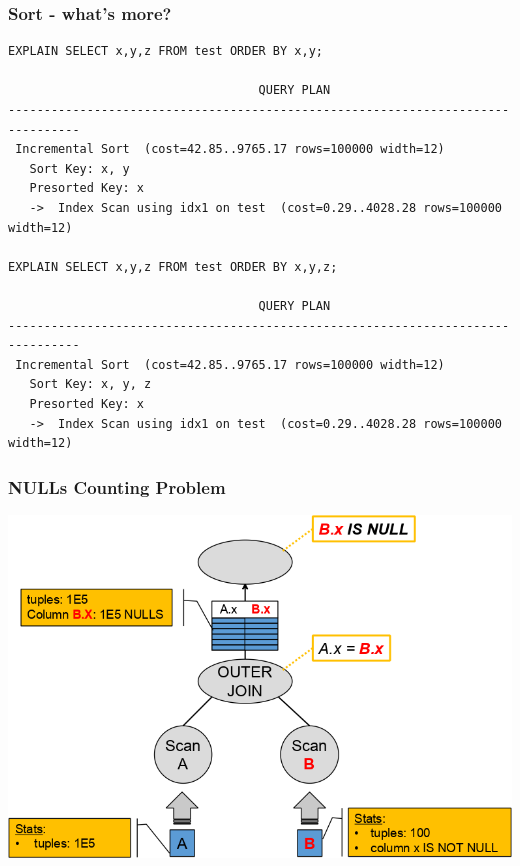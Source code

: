 \documentclass{beamer}
\begin{document}
\begin{frame}[fragile]\frametitle{Sort - what's more?}
\begin{lstlisting}[basicstyle=\scriptsize]
EXPLAIN SELECT x,y,z FROM test ORDER BY x,y;

                                   QUERY PLAN                                   
--------------------------------------------------------------------------------
 Incremental Sort  (cost=42.85..9765.17 rows=100000 width=12)
   Sort Key: x, y
   Presorted Key: x
   ->  Index Scan using idx1 on test  (cost=0.29..4028.28 rows=100000 width=12)

EXPLAIN SELECT x,y,z FROM test ORDER BY x,y,z;

                                   QUERY PLAN                                   
--------------------------------------------------------------------------------
 Incremental Sort  (cost=42.85..9765.17 rows=100000 width=12)
   Sort Key: x, y, z
   Presorted Key: x
   ->  Index Scan using idx1 on test  (cost=0.29..4028.28 rows=100000 width=12)
\end{lstlisting}
\end{frame}


\begin{frame}[fragile]\frametitle{NULLs Counting Problem}
  \centerline{\includegraphics[scale=0.4]{pics/nulls_counting.png}}
\end{frame}
\end{document}
